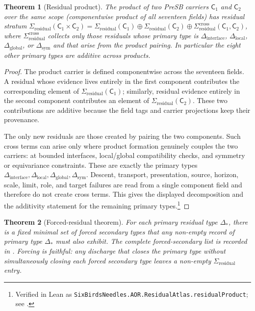 \documentclass[11pt]{article}
\newcommand{\Sigres}{\Sigma_{\mathrm{residual}}}
\newcommand{\Dinterface}{\Delta_{\mathrm{interface}}}
\newcommand{\Dlocal}{\Delta_{\mathrm{local}}}
\newcommand{\Dglobal}{\Delta_{\mathrm{global}}}
\newcommand{\Dsym}{\Delta_{\mathrm{sym}}}
\newtheorem{theorem}{Theorem}[section]
\theoremstyle{definition}
\begin{document}
\begin{theorem}[Residual product]\label{thm:aor:residual-product}
The product of two PreSB carriers $\mathsf C_1$ and $\mathsf C_2$ over
the same scope (componentwise product of all seventeen fields) has
residual stratum
$\Sigres(\mathsf C_1\times\mathsf C_2)
   = \Sigres(\mathsf C_1) \oplus \Sigres(\mathsf C_2)
     \oplus \Sigres^{\mathrm{cross}}(\mathsf C_1,\mathsf C_2)$,
where $\Sigres^{\mathrm{cross}}$ collects only those residuals whose
primary type is $\Dinterface$, $\Dlocal$, $\Dglobal$, or $\Dsym$ and
that arise from the product pairing.  In particular the eight other
primary types are additive across products.
\end{theorem}

\begin{proof}
The product carrier is defined componentwise across the seventeen fields.
A residual whose evidence lives entirely in the first component contributes
the corresponding element of \(\Sigres(\mathsf C_1)\); similarly, residual
evidence entirely in the second component contributes an element of
\(\Sigres(\mathsf C_2)\).  These two contributions are additive because the
field tags and carrier projections keep their provenance.

The only new residuals are those created by pairing the two components.
Such cross terms can arise only where product formation genuinely couples
the two carriers: at bounded interfaces, local/global compatibility checks,
and symmetry or equivariance constraints.  These are exactly the primary
types \(\Dinterface,\Dlocal,\Dglobal,\Dsym\).  Descent, transport,
presentation, source, horizon, scale, limit, role, and target failures are
read from a single component field and therefore do not create cross terms.
This gives the displayed decomposition and the additivity statement for the
remaining primary types.\footnote{Verified in Lean as \texttt{SixBirdsNeedles.AOR.ResidualAtlas.residualProduct}; see .}
\end{proof}

\begin{theorem}[Forced-residual theorem]\label{thm:aor:forced-residual}
For each primary residual type $\Delta_*$, there is a fixed minimal set
of \emph{forced secondary types} that any non-empty record of primary
type $\Delta_*$ must also exhibit.  The complete forced-secondary list is
recorded in .  Forcing is faithful:
any discharge that closes the primary type without simultaneously closing
each forced secondary type leaves a non-empty $\Sigres$ entry.
\end{theorem}
\end{document}
